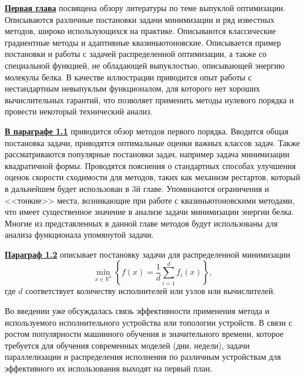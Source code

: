 \underline{\textbf{Первая глава}} посвящена обзору литературы по теме выпуклой оптимизации. Описываются различные постановки задачи минимизации и ряд известных методов, широко использующихся на практике. Описываются классические градиентные методы и адаптивные квазиньютоновские. Описывается пример постановки и работы с задачей распределенной оптимизации, а также со специальной функцией, не обладающей выпуклостью, описывающей энергию молекулы белка. В качестве иллюстрации приводится опыт работы с нестандартным невыпуклым функционалом, для которого нет хороших вычислительных гарантий, что позволяет применить методы нулевого порядка и провести некоторый технический анализ.

\underline{\textbf{В параграфе 1.1}} приводится обзор методов первого порядка. Вводится общая постановка задачи, приводятся оптимальные оценки важных классов задач. Также рассматриваются популярные постановки задач, например задача минимизации квадратичной формы. Проводятся пояснения о стандартных способах улучшения оценок скорости сходимости для методов, таких как механизм рестартов, который в дальнейшем будет использован в 3й главе. Упоминаются ограничения и <<тонкие>> места, возникающие при работе с квазиньютоновскими методами, что имеет существенное значение в анализе задачи минимизации энергии белка. Многие из представленных в данной главе методов будут использованы для анализа функционала упомянутой задачи.

\underline{\textbf{Параграф 1.2}} описывает постановку задачи для распределенной минимизации
  \begin{equation} \label{raspr_task}
    \min_{x \in \mathbb{R}^n}\left\{f(x)=\frac{1}{d} \sum_{i=1}^d f_i(x)\right\},
  \end{equation}
  где $d$ соответствует количеству исполнителей или узлов или вычислителей. 

  Во введении уже обсуждалась связь эффективности применения метода и используемого исполнительного устройства или топологии устройств. В связи с ростом популярности машинного обучения и значительного времени, которое требуется для обучения современных моделей (дни, недели), задачи параллелизации и распределения исполнения по различным устройствам для эффективного их использования выходят на первый план.

